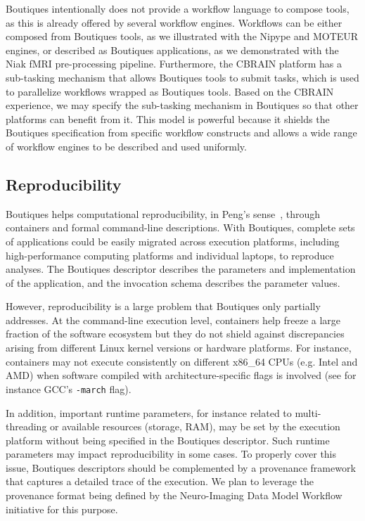 \documentclass[a4paper,num-refs]{oup-contemporary}
\newcommand{\boutiques}{Boutiques\xspace}
\begin{document}
\boutiques intentionally does not provide a workflow language to
compose tools, as this is already offered by several workflow
engines. Workflows can be either composed from \boutiques tools, as we
illustrated with the Nipype and MOTEUR engines, or described as
\boutiques applications, as we demonstrated with the Niak fMRI
pre-processing pipeline. Furthermore, the CBRAIN platform has a
sub-tasking mechanism that allows \boutiques tools to submit tasks,
which is used to parallelize workflows wrapped as \boutiques
tools. Based on the CBRAIN experience, we may specify the sub-tasking
mechanism in \boutiques so that other platforms can benefit from it.
This model is powerful because it shields the \boutiques specification
from specific workflow constructs and allows a wide range of workflow
engines to be described and used uniformly.


\subsection{Reproducibility}

\boutiques helps computational reproducibility, in Peng's
sense~\cite{peng2011reproducible}, through containers and formal
command-line descriptions. With \boutiques, complete sets of
applications could be easily migrated across execution platforms,
including high-performance computing platforms and individual laptops,
to reproduce analyses. The \boutiques descriptor describes the
parameters and implementation of the application, and the invocation
schema describes the parameter values.

However, reproducibility is a large problem that \boutiques only
partially addresses. At the command-line execution level, containers
help freeze a large fraction of the software ecosystem but they do not
shield against discrepancies arising from different Linux kernel
versions or hardware platforms. For instance, containers may not
execute consistently on different x86\_64 CPUs (e.g. Intel and AMD)
when software compiled with architecture-specific flags is involved
(see for instance GCC's \texttt{-march} flag).

In addition, important runtime parameters, for instance related to
multi-threading or available resources (storage, RAM), may be set by
the execution platform without being specified in the \boutiques
descriptor. Such runtime parameters may impact reproducibility in some
cases. To properly cover this issue, \boutiques descriptors should be
complemented by a provenance framework that captures a detailed trace
of the execution. We plan to leverage the provenance format being
defined by the Neuro-Imaging Data Model
Workflow~\cite{ghosh2017capturing} initiative for this purpose.
\end{document}
